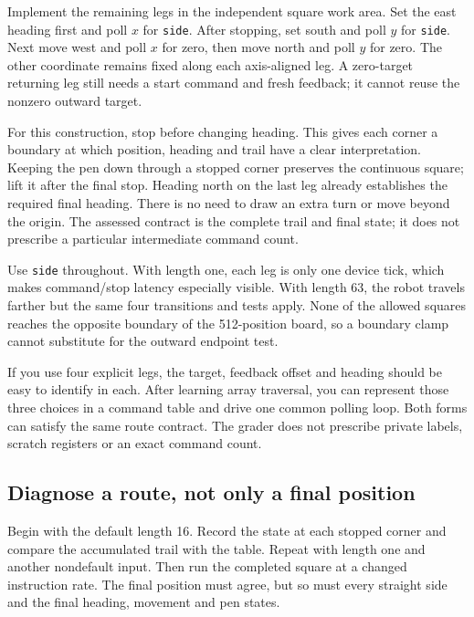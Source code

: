 Implement the remaining legs in the independent square work area. Set the east
heading first and poll $x$ for \texttt{side}. After stopping, set south and poll
$y$ for \texttt{side}. Next move west and poll $x$ for zero, then move north and
poll $y$ for zero. The other coordinate remains fixed along each axis-aligned
leg. A zero-target returning leg still needs a start command and fresh feedback;
it cannot reuse the nonzero outward target.



For this construction, stop before changing heading. This gives each corner a boundary at which position,
heading and trail have a clear interpretation. Keeping the pen down through a
stopped corner preserves the continuous square; lift it after the final stop.
Heading north on the last leg already establishes the required final heading.
There is no need to draw an extra turn or move beyond the origin. The assessed
contract is the complete trail and final state; it does not prescribe a particular
intermediate command count.

Use \texttt{side} throughout. With length one, each leg is only one device tick,
which makes command/stop latency especially visible. With length 63, the robot
travels farther but the same four transitions and tests apply. None of the allowed
squares reaches the opposite boundary of the 512-position board, so a boundary
clamp cannot substitute for the outward endpoint test.

If you use four explicit legs, the target, feedback offset and heading should be
easy to identify in each. After learning array traversal, you can represent those
three choices in a command table and drive one common polling loop. Both forms
can satisfy the same route contract. The grader does not prescribe private labels,
scratch registers or an exact command count.

\subsection*{Diagnose a route, not only a final position}

Begin with the default length 16. Record the state at each stopped corner and
compare the accumulated trail with the table. Repeat with length one and another
nondefault input. Then run the completed square at a changed instruction rate.
The final position must agree, but so must every straight side and the final
heading, movement and pen states.

